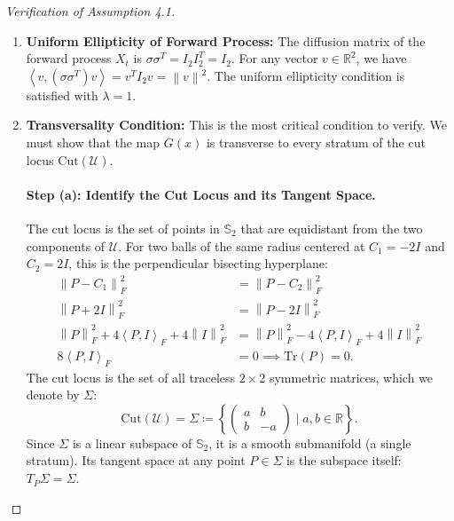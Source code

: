 \documentclass[12pt, letterpaper]{amsart}
\newcommand{\Ucal}{\mathcal{U}}
\newcommand{\R}{\mathbb{R}}
\newcommand{\norm}[1]{\left\lVert#1\right\rVert}
\newcommand{\scpr}[2]{\left\langle #1, #2 \right\rangle}
\newcommand{\Tr}{\mathrm{Tr}}
\theoremstyle{plain}
\theoremstyle{definition}
\theoremstyle{remark}
\numberwithin{equation}{section} %
\begin{document}
\begin{appendices}
\begin{proof}[Verification of Assumption 4.1]
\begin{enumerate}[label=(\roman*)]
    \item \textbf{Uniform Ellipticity of Forward Process:} The diffusion matrix of the forward process $X_t$ is $\sigma\sigma^T = I_2 I_2^T = I_2$. For any vector $v \in \R^2$, we have $\scpr{v}{(\sigma\sigma^T)v} = v^T I_2 v = \norm{v}^2$. The uniform ellipticity condition is satisfied with $\lambda = 1$.
    
    \item \textbf{Transversality Condition:} This is the most critical condition to verify. We must show that the map $G(x)$ is transverse to every stratum of the cut locus $\mathrm{Cut}(\Ucal)$.
    
    \paragraph{Step (a): Identify the Cut Locus and its Tangent Space.}
    The cut locus is the set of points in $\mathbb{S}_2$ that are equidistant from the two components of $\Ucal$. For two balls of the same radius centered at $C_1=-2I$ and $C_2=2I$, this is the perpendicular bisecting hyperplane:
    \begin{align*}
        \norm{P - C_1}_F^2 &= \norm{P - C_2}_F^2 \\
        \norm{P + 2I}_F^2 &= \norm{P - 2I}_F^2 \\
        \norm{P}_F^2 + 4\scpr{P}{I}_F + 4\norm{I}_F^2 &= \norm{P}_F^2 - 4\scpr{P}{I}_F + 4\norm{I}_F^2 \\
        8\scpr{P}{I}_F &= 0 \implies \Tr(P) = 0.
    \end{align*}
    The cut locus is the set of all traceless $2\times2$ symmetric matrices, which we denote by $\Sigma$:
    \[ \mathrm{Cut}(\Ucal) = \Sigma \coloneqq \left\{ \begin{pmatrix} a & b \\ b & -a \end{pmatrix} \mid a,b \in \R \right\}. \]
    Since $\Sigma$ is a linear subspace of $\mathbb{S}_2$, it is a smooth submanifold (a single stratum). Its tangent space at any point $P \in \Sigma$ is the subspace itself: $T_P\Sigma = \Sigma$.
    

\end{enumerate}
\end{proof}
\end{appendices}
\end{document}
